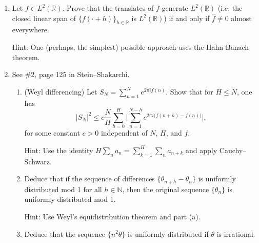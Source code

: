 \documentclass[a4paper]{article}
\begin{document}
\begin{enumerate}
\begin{proof}
    Letting $\mu$ denote Lebesgue measure, we have
    \begin{align*}
      \|f\|_\infty^2 &= \| f^2 \|_\infty \\
      &= \inf \left\{ a\geq 0 : \mu \left( \{ x : f^2(x) > a \} \right) = 0 \right\} \\
      &= \inf \left\{ a \geq 0 : \mu \left( \{x : \int_{-\infty}^{x} 2 f(t) f'(t) dt > a \} \right) = 0 \right\} \\
      &\leq 2 \|f\|_p \|f'\|_q
    \end{align*}
    by H\"older's inequality.

  \end{proof}


\item Let $f \in L^ 2 (\mathbb R)$. Prove that the translates of $f$ generate $L^2(\mathbb R)$ (i.e. the closed linear span of $ \{ f(\cdot + h)  \}_{h\in \mathbb R}$ is $L^ 2 (\mathbb R)$)  if and only if $\widehat{f} \neq 0$ almost everywhere.

Hint: One (perhaps, the simplest) possible approach uses the Hahn-Banach theorem.

\item See \#2, page 125 in Stein--Shakarchi.


\begin{enumerate}

\item (Weyl differencing) Let $S_N = \sum_{n=1}^N e^{2\pi i f(n)}$. Show that for $H\le N$, one has  $$ |S_N|^2 \le c \frac{N}{H}  \sum_{h=0}^H \bigg| \sum_{n=1}^{N-h} e^{2\pi i \big( f(n+h)  - f (n) \big)}  \bigg|,  $$ for some constant $c>0$  independent of $N$, $H$, and $f$.

Hint: Use the identity $H \sum_n a_n = \sum_{k=1}^H \sum_n a_{n+k}$ and apply Cauchy--Schwarz.

\item Deduce that if the  sequence of differences $\{ \theta_{n+h} - \theta_n \} $ is uniformly distributed mod 1 for all $h \in \mathbb N$, then the original sequence $\{ \theta_n \}$ is uniformly distributed mod 1.

Hint: Use Weyl's equidistribution theorem and part (a).

\item Deduce that the sequence $\{ n^2 \theta \}$ is uniformly distributed  if $\theta$ is irrational.


\end{enumerate}

\end{enumerate}
\end{document}

